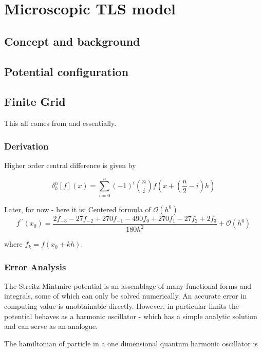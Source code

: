 \chapter{Microscopic TLS model}
\section{Concept and background}
\section{Potential configuration}

\section{Finite Grid}

This all comes from \cite{Mathews2004} and \cite{Holoborodko2009} essentially.

\subsection{Derivation}
Higher order central difference is given by 

\begin{equation}
\delta^n_h[f](x) = \sum_{i = 0}^{n} (-1)^i \binom{n}{i} f\left(x + \left(\frac{n}{2} - i\right) h\right)
\end{equation}

Later, for now - here it is: Centered formula of $\mathcal{O}(h^{6})$.
\begin{equation}
f^{\prime\prime}(x_0)=\frac{2f_{-3}-27f_{-2}+270f_{-1}-490f_{0}+270f_{1}-27f_{2}+2f_{3}}{180h^{2}}+\mathcal{O}(h^{6})
\end{equation}

where $f_k = f(x_0 + kh)$.

\subsection{Error Analysis}
The Streitz Mintmire potential \cite{Streitz1994} is an assemblage of many functional forms and integrals, some of which can only be solved numerically. An accurate error in computing value is unobtainable directly. However, in particular limits the potential behaves as a harmonic oscillator - which has a simple analytic solution and can serve as an analogue.

The hamiltonian of particle in a one dimensional quantum harmonic oscillator is

